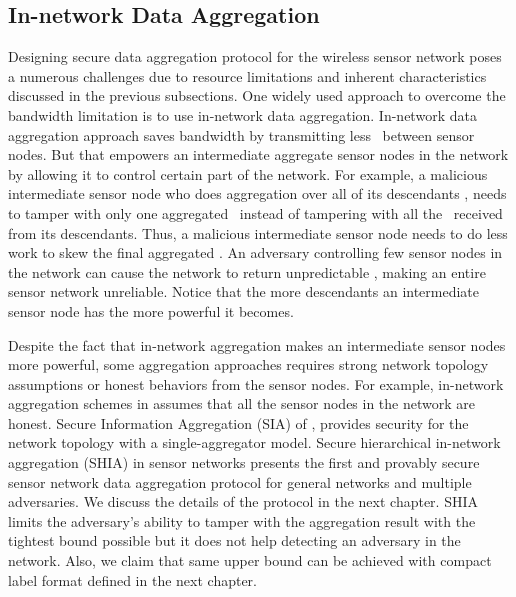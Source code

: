		\subsection{In-network Data Aggregation}
		Designing secure data aggregation protocol for the wireless sensor network poses a numerous challenges due to resource limitations and inherent characteristics discussed in the previous subsections. 
		One widely used approach to overcome the bandwidth limitation is to use in-network data aggregation.
		In-network data aggregation approach saves bandwidth by transmitting less \payloads\  between sensor nodes.
		But that empowers an intermediate aggregate sensor nodes in the network by allowing it to control certain part of the network.
		For example, a malicious intermediate sensor node who does aggregation over all of its descendants \payloads, needs to tamper with only one aggregated \payload\ instead of tampering with all the \payloads\ received from its descendants. 
		Thus, a malicious intermediate sensor node needs to do less work to skew the final aggregated \payload.
		An adversary controlling few sensor nodes in the network can cause the network to return unpredictable \payloads, making an entire sensor network unreliable.
		Notice that the more descendants an intermediate sensor node has the more powerful it becomes.
		
		Despite the fact that in-network aggregation makes an intermediate sensor nodes more powerful, some aggregation approaches requires strong network topology assumptions or honest behaviors from the sensor nodes.
		For example, in-network aggregation schemes in \cite{yao2002cougar, madden2003design} assumes that all the sensor nodes in the network are honest. Secure Information Aggregation (SIA) of \cite{przydatek2003sia}, provides security for the network topology with a single-aggregator model.  
		Secure hierarchical in-network aggregation (SHIA) in sensor networks \cite{chan2006secure} presents the first and provably secure sensor network data aggregation protocol for general networks and multiple adversaries. 
		We discuss the details of the protocol in the next chapter. 
		SHIA limits the adversary's ability to tamper with the aggregation result with the tightest bound possible but it does not help detecting an adversary in the network.
		Also, we claim that same upper bound can be achieved with compact label format defined in the next chapter.
